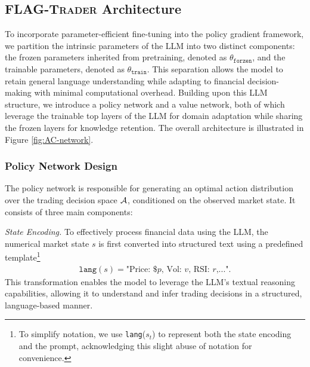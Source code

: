 \subsection{\textsc{FLAG-Trader} Architecture}

To incorporate parameter-efficient fine-tuning into the policy gradient framework, we partition the intrinsic parameters of the LLM into two distinct components: the frozen parameters inherited from pretraining, denoted as 
$\theta_{\texttt{forzen}}$, and the trainable parameters, denoted as 
$\theta_{\texttt{train}}$. This separation allows the model to retain general language understanding while adapting to financial decision-making with minimal computational overhead.
Building upon this LLM structure, we introduce a policy network and a value network, both of which leverage the trainable top layers of the LLM for domain adaptation while sharing the frozen layers for knowledge retention. The overall architecture is illustrated in Figure \ref{fig:AC-network}.




\subsubsection{Policy Network Design}
The policy network is responsible for generating an optimal action distribution over the trading decision space $\mathcal{A}$, conditioned on the observed market state. It consists of three main components:



\emph{State Encoding.}
To effectively process financial data using the LLM, the numerical market state 
$s$ is first converted into structured text using a predefined template\footnote{To simplify notation, we use \texttt{lang}($s_t$) to represent both the state encoding and the prompt, acknowledging this slight abuse of notation for convenience.}
\begin{align}
\texttt{lang}(s) = \text{"Price: \$}p\text{, Vol: }v\text{, RSI: }r\text{,..."}.
\label{eq:template}
\end{align}
This transformation enables the model to leverage the LLM’s textual reasoning capabilities, allowing it to understand and infer trading decisions in a structured, language-based manner.

